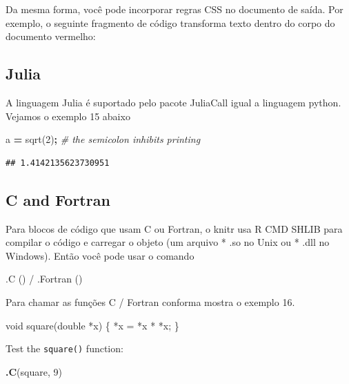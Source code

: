 \documentclass[
]{book}
\newenvironment{Shaded}{\begin{snugshade}}{\end{snugshade}}
\newcommand{\CommentTok}[1]{\textcolor[rgb]{0.56,0.35,0.01}{\textit{#1}}}
\newcommand{\DataTypeTok}[1]{\textcolor[rgb]{0.13,0.29,0.53}{#1}}
\newcommand{\DecValTok}[1]{\textcolor[rgb]{0.00,0.00,0.81}{#1}}
\newcommand{\FloatTok}[1]{\textcolor[rgb]{0.00,0.00,0.81}{#1}}
\newcommand{\KeywordTok}[1]{\textcolor[rgb]{0.13,0.29,0.53}{\textbf{#1}}}
\newcommand{\NormalTok}[1]{#1}
\newcommand{\OperatorTok}[1]{\textcolor[rgb]{0.81,0.36,0.00}{\textbf{#1}}}
\newcommand{\StringTok}[1]{\textcolor[rgb]{0.31,0.60,0.02}{#1}}
\begin{document}
Da mesma forma, você pode incorporar regras CSS no documento de saída. Por exemplo, o seguinte fragmento de código transforma
texto dentro do corpo do documento vermelho:

\hypertarget{julia}{%
\subsection{Julia}\label{julia}}

A linguagem Julia é suportado pelo pacote JuliaCall igual a linguagem python. Vejamos o exemplo 15 abaixo

\begin{Shaded}
\begin{Highlighting}[]
\NormalTok{a }\OperatorTok{=}\NormalTok{ sqrt(}\FloatTok{2}\NormalTok{)}\OperatorTok{;} \CommentTok{\# the semicolon inhibits printing}
\end{Highlighting}
\end{Shaded}

\begin{verbatim}
## 1.4142135623730951
\end{verbatim}

\hypertarget{c-and-fortran}{%
\subsection{C and Fortran}\label{c-and-fortran}}

Para blocos de código que usam C ou Fortran, o knitr usa R CMD SHLIB para compilar o código e carregar o objeto (um arquivo * .so no Unix ou * .dll no Windows). Então você pode usar o comando

.C () / .Fortran ()

Para chamar as funções C / Fortran conforma mostra o exemplo 16.

\begin{Shaded}
\begin{Highlighting}[]
\DataTypeTok{void}\NormalTok{ square(}\DataTypeTok{double}\NormalTok{ *x) \{}
\NormalTok{*x = *x * *x;}
\NormalTok{\}}
\end{Highlighting}
\end{Shaded}

Test the \texttt{square()} function:

\begin{Shaded}
\begin{Highlighting}[]
\KeywordTok{.C}\NormalTok{(}\StringTok{\textquotesingle{}square\textquotesingle{}}\NormalTok{, }\DecValTok{9}\NormalTok{)}
\end{Highlighting}
\end{Shaded}
\end{document}
